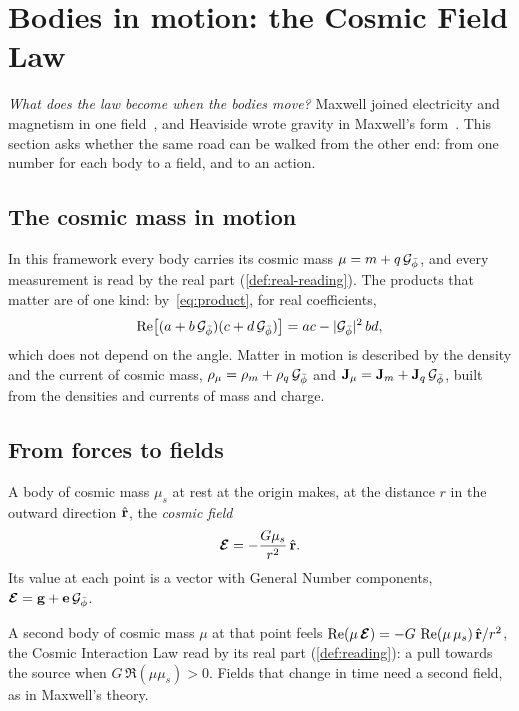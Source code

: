 \section{Bodies in motion: the Cosmic Field Law}\label{sec:motion}

\emph{What does the law become when the bodies move?} Maxwell joined electricity and magnetism in one field~\citep{Maxwell1865}, and Heaviside wrote gravity in Maxwell's form~\citep{Heaviside1893}. This section asks whether the same road can be walked from the other end: from one number for each body to a field, and to an action.

\subsection{The cosmic mass in motion}\label{subsec:un-reading}

In this framework every body carries its cosmic mass $\mu = m + q\,\mathcal{G}_{\bar{\phi}}$, and every measurement is read by the real part (\cref{def:real-reading}). The products that matter are of one kind: by~\cref{eq:product}, for real coefficients,
\begin{equation}\label{eq:real-product}
\operatorname{Re}\bigl[(a + b\,\mathcal{G}_{\bar{\phi}})(c + d\,\mathcal{G}_{\bar{\phi}})\bigr] = ac - \lvert\mathcal{G}_{\bar{\phi}}\rvert^2\,bd ,
\end{equation}
which does not depend on the angle. Matter in motion is described by the density and the current of cosmic mass, $\rho_\mu = \rho_m + \rho_q\,\mathcal{G}_{\bar{\phi}}$ and $\mathbf{J}_\mu = \mathbf{J}_m + \mathbf{J}_q\,\mathcal{G}_{\bar{\phi}}$, built from the densities and currents of mass and charge.

\subsection{From forces to fields}\label{subsec:un-fields}

\begin{definition}\label{def:un-field}
A body of cosmic mass $\mu_s$ at rest at the origin makes, at the distance $r$ in the outward direction $\hat{\mathbf{r}}$, the \emph{cosmic field}
\[
\boldsymbol{\mathcal{E}} = -\frac{G\mu_s}{r^2}\,\hat{\mathbf{r}} .
\]
Its value at each point is a vector with General Number components, $\boldsymbol{\mathcal{E}} = \mathbf{g} + \mathbf{e}\,\mathcal{G}_{\bar{\phi}}$.
\end{definition}

A second body of cosmic mass $\mu$ at that point feels $\operatorname{Re}(\mu\,\boldsymbol{\mathcal{E}}) = -G\,\operatorname{Re}(\mu\,\mu_s)\,\hat{\mathbf{r}}/r^2$, the Cosmic Interaction Law read by its real part (\cref{def:reading}): a pull towards the source when $G\,\Re(\mu\mu_s) > 0$. Fields that change in time need a second field, as in Maxwell's theory.

